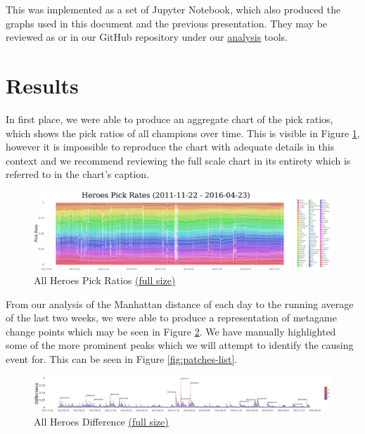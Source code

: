 This was implemented as a set of Jupyter Notebook, which also produced the graphs used in this document and the previous presentation. They may be reviewed as  or in our GitHub repository under our \href{https://github.com/marcolussetti/opendotadump-tools/tree/master/analysis/heroes_picks}{analysis} tools.

\section{Results}

In first place, we were able to produce an aggregate chart of the pick ratios, which shows the pick ratios of all champions over time. This is visible in Figure \ref{fig:pick-ratios-stacked-all}, however it is impossible to reproduce the chart with adequate details in this context and we recommend reviewing the full scale chart in its entirety which is referred to in the chart's caption.

\begin{figure}
    \centering
    \caption{All Heroes Pick Ratios \href{https://raw.githubusercontent.com/marcolussetti/opendotadump-tools/master/poster/plots/poster_stacked_white_44x12.png}{(full size)}}
    \label{fig:pick-ratios-stacked-all}
    \includegraphics[angle=90,origin=c,height=0.6\textheight]{poster_stacked_white_44x12_025_3041x808.png}
\end{figure}

From our analysis of the Manhattan distance of each day to the running average of the last two weeks, we were able to produce a representation of metagame change points which may be seen in Figure \ref{fig:pick-ratios-differences-labelled-all}. We have manually highlighted some of the more prominent peaks which we will attempt to identify the causing event for. This can be seen in Figure \ref{fig:patches-list}.

\begin{figure}[p]
    \centering
    \caption{All Heroes Difference \href{https://raw.githubusercontent.com/marcolussetti/opendotadump-tools/master/poster/differences_labelled.png}{(full size)}}
    \label{fig:pick-ratios-differences-labelled-all}
    \includegraphics[angle=90,origin=c,height=0.5\textheight]{differences_labelled_1920x231.png}
\end{figure}

